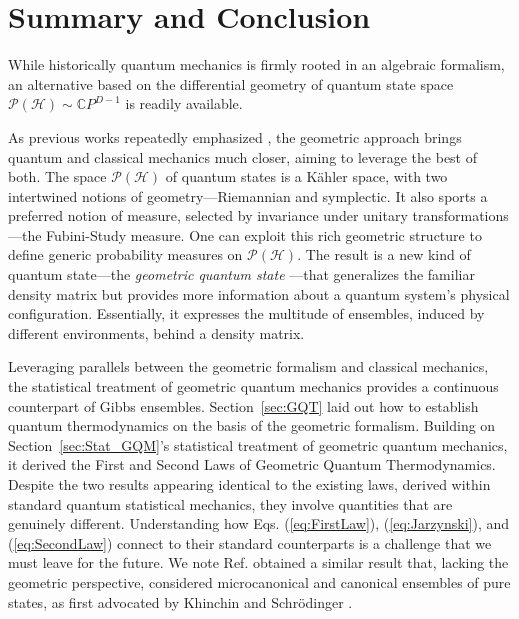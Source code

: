 \documentclass[draft,nofootinbib,pre,twocolumn,showpacs,showkeys,groupaddress,preprintnumbers,floatfix]{revtex4-1}
\newcommand{\1}{\mathbbm{1}}
\newcommand{\PH}{\mathcal{P}(\mathcal{H})}
\begin{document}
\section{Summary and Conclusion}\label{sec:Discussion}

While historically quantum mechanics is firmly rooted in an algebraic
formalism, an alternative based on the differential geometry of quantum state
space $\mathcal{P}(\mathcal{H}) \sim \mathbb{C}P^{D-1}$ is readily available.

As previous works repeatedly emphasized
\cite{Bengtsson2017,STROCCHI1966,Heslot1985}, the geometric approach brings
quantum and classical mechanics much closer, aiming to leverage the best of
both. The space $\PH$ of quantum states is a K\"ahler space, with two
intertwined notions of geometry---Riemannian and symplectic. It also sports a
preferred notion of measure, selected by invariance under unitary
transformations---the Fubini-Study measure. One can exploit this rich
geometric structure to define generic probability measures on $\PH$. The
result is a new kind of quantum state---the \emph{geometric quantum
state} \cite{Anza20a}---that generalizes the familiar density matrix but
provides more information about a quantum system's physical configuration.
Essentially, it expresses the multitude of ensembles, induced by different
environments, behind a density matrix.

Leveraging parallels between the geometric formalism and classical mechanics,
the statistical treatment of geometric quantum mechanics provides a continuous
counterpart of Gibbs ensembles. Section~\ref{sec:GQT} laid out how to
establish quantum thermodynamics on the basis of the geometric formalism.
Building on Section~\ref{sec:Stat_GQM}'s statistical treatment of geometric
quantum mechanics, it derived the First and Second Laws of Geometric Quantum
Thermodynamics. Despite the two results appearing identical to the existing
laws, derived within standard quantum statistical mechanics, they involve
quantities that are genuinely different. Understanding how Eqs.
(\ref{eq:FirstLaw}), (\ref{eq:Jarzynski}), and (\ref{eq:SecondLaw}) connect to
their standard counterparts \cite{Deffner2019} is a challenge that we must
leave for the future. We note Ref. \cite{Campisi13} obtained a similar result
that, lacking the geometric perspective, considered microcanonical and
canonical ensembles of pure states, as first advocated by Khinchin
\cite{Khin51} and Schr\"odinger \cite{Sch52}.
\end{document}

